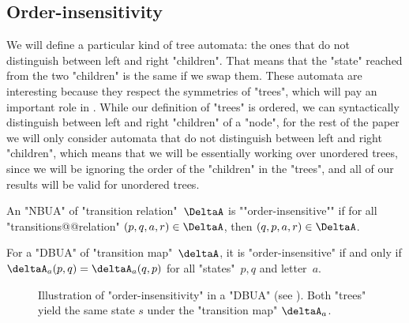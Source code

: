 \documentclass[a4paper,UKenglish,cleveref, autoref, thm-restate]{lipics-v2021}
\begin{document}
\subsection{Order-insensitivity}\label{sec:OrderAutomata}

We will define a particular kind of tree automata: the ones that do not distinguish between left and right "children".
That means that the "state" reached from the two "children" is the same if we swap them. These automata are
interesting because they respect the symmetries of "trees", which will pay an important role in .
While our definition of "trees" is ordered, \ie we can syntactically distinguish between left and right "children" of a "node",
for the rest of the paper we will only consider automata that do not distinguish between left and right "children", which means that
we will be essentially working over unordered trees, since we will be ignoring the order of the "children" in the "trees", and all of our results
will be valid for unordered trees.


\begin{definition}
	\AP An "NBUA" of "transition relation"~$\DeltaA$ is ""order-insensitive"" if for all "transitions@@relation" $(p,q,a,r) \in \DeltaA$, then
	$(q,p,a,r) \in \DeltaA$.
\end{definition}

\begin{remark}\label{def:order-insensitive}
	For a "DBUA" of "transition map"~$\deltaA$, it is "order-insensitive" if and only if
	$\deltaA_a (p,q) = \deltaA_a (q,p)$ for all "states"~$p,q$ and letter~$a$.
\end{remark}


\begin{figure}[h]
	\centering
	\caption{Illustration of "order-insensitivity" in a "DBUA" (see ).
		Both "trees" yield the same state $s$ under the "transition map" $\deltaA_a$.}
	\label{fig:order-insensitivity}
\end{figure}
\end{document}
